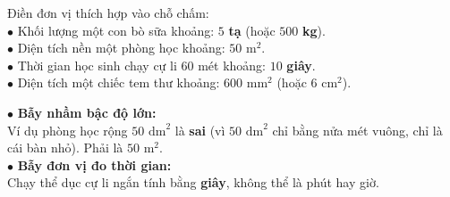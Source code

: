 \documentclass[14pt,a4paper,oneside]{extbook}
\begin{document}
\noindent
\begin{minipage}[t]{0.53\textwidth}
  \begin{tcolorbox}[
    enhanced,
    title={\footnotesize\bfseries\color{white}\faCheckCircle\ Ví dụ thực hành chuẩn mực},
    colback=green!2!white,
    colframe=green!60!black,
    arc=2.5mm, boxrule=0.8pt, top=1.8mm, bottom=1.8mm, left=2.2mm, right=2.2mm
  ]
    \footnotesize
    Điền đơn vị thích hợp vào chỗ chấm:\\
    $\bullet$ Khối lượng một con bò sữa khoảng: $5$ \textbf{tạ} (hoặc $500$ \textbf{kg}).\\
    $\bullet$ Diện tích nền một phòng học khoảng: $50$ \textbf{$\text{m}^2$}.\\
    $\bullet$ Thời gian học sinh chạy cự li 60 mét khoảng: $10$ \textbf{giây}.\\
    $\bullet$ Diện tích một chiếc tem thư khoảng: $600$ \textbf{$\text{mm}^2$} (hoặc $6\text{ cm}^2$).
  \end{tcolorbox}
\end{minipage}%
\hfill
\begin{minipage}[t]{0.45\textwidth}
  \begin{tcolorbox}[
    enhanced,
    title={\footnotesize\bfseries\color{white}\faExclamationTriangle\ Mẹo tránh bẫy trắc nghiệm},
    colback=red!2!white,
    colframe=red!70!black,
    arc=2.5mm, boxrule=0.8pt, top=1.8mm, bottom=1.8mm, left=2.2mm, right=2.2mm
  ]
    \footnotesize
    $\bullet$ \textbf{Bẫy nhầm bậc độ lớn:}\\
    Ví dụ phòng học rộng $50\text{ dm}^2$ là \textbf{sai} (vì $50\text{ dm}^2$ chỉ bằng nửa mét vuông, chỉ là cái bàn nhỏ). Phải là $50\text{ m}^2$.\\
    $\bullet$ \textbf{Bẫy đơn vị đo thời gian:}\\
    Chạy thể dục cự li ngắn tính bằng \textbf{giây}, không thể là phút hay giờ.
  \end{tcolorbox}
\end{minipage}
\end{document}
